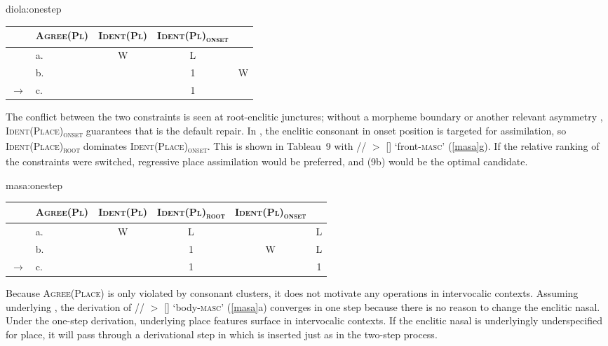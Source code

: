 \documentclass[output=paper,modfonts,nonflat,hidelinks]{langsci/langscibook}
\begin{document}
\begin{table}
    		{diola:onestep}
    \begin{tabular}{|rl||c|c:c|} \hline
     &
    	\textsc{Agree(Pl)} &
        \textsc{Ident(Pl)} &
        \textsc{Ident(Pl)\textsubscript{onset}}\\
    \hline \hline
	      & a.         & W & L &   \\ \hline
          & b.         &   & 1 & W \\ \hline
    $\to$ & c.         &   & 1 &   \\ \hline
    \end{tabular}
\end{table}

The conflict between the two  constraints is seen at root-enclitic junctures; without a morpheme boundary or another relevant asymmetry \citep{lamont2015}, \textsc{Ident(Place)\textsubscript{onset}} guarantees that  is the default repair. In , the enclitic consonant in onset position is targeted for assimilation, so \textsc{Ident(Place)\textsubscript{root}} dominates \textsc{Ident(Place)\textsubscript{onset}}. This is shown in Tableau~9 with // $>$ [] `front-\textsc{masc}' (\ref{masa}g). If the relative ranking of the  constraints were switched, regressive place assimilation would be preferred, and (9b) would be the optimal candidate.

\begin{table}
    		{masa:onestep}
    \begin{tabular}{|rl||c|c:c|c|} \hline
     &
    	\textsc{Agree(Pl)} &
        \textsc{Ident(Pl)} &
        \textsc{Ident(Pl)\textsubscript{root}} &
        \textsc{Ident(Pl)\textsubscript{onset}}\\
    \hline \hline
	      & a.         & W & L &   & L \\ \hline
          & b.         &   & 1 & W & L \\ \hline
    $\to$ & c.         &   & 1 &   & 1 \\ \hline
    \end{tabular}
\end{table}

Because \textsc{Agree(Place)} is only violated by consonant clusters, it does not motivate any operations in intervocalic contexts. Assuming underlying , the derivation of // $>$ [] `body-\textsc{masc}' (\ref{masa}a) converges in one step because there is no reason to change the enclitic nasal. Under the one-step derivation, underlying place features surface in intervocalic contexts. If the enclitic nasal is underlyingly underspecified for place, it will pass through a derivational step in which  is inserted just as in the two-step process.
\end{document}
